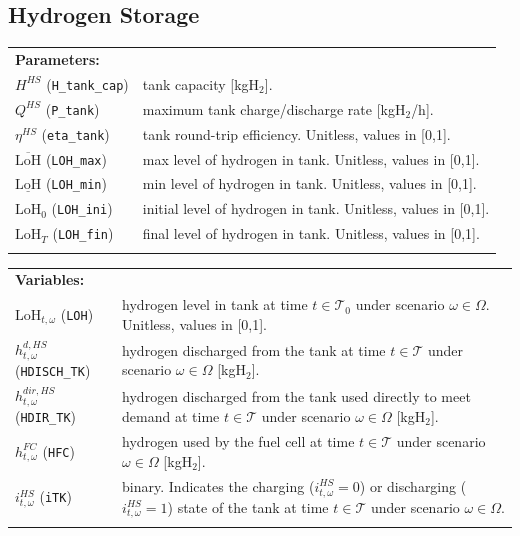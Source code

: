 \documentclass{article}
\newcommand{\LOH}{\text{LoH}}
\begin{document}
\subsection{Hydrogen Storage}
\label{SEC:StorageTank}

\noindent
\begin{tabularx}{\textwidth}{@{}l X@{}}
    \textbf{Parameters:} \\
    $H^{HS}$ (\verb|H_tank_cap|)
      & tank capacity [kgH$_2$]. \\
    $Q^{HS}$ (\verb|P_tank|)
      & maximum tank charge/discharge rate [kgH$_2$/h]. \\
    $\eta^{HS}$ (\verb|eta_tank|)
      & tank round-trip efficiency. Unitless, values in [0,1]. \\
    $\overline{\LOH}$ (\verb|LOH_max|)
      & max level of hydrogen in tank. Unitless, values in [0,1]. \\
    $\underline{\LOH}$ (\verb|LOH_min|)
      & min level of hydrogen in tank. Unitless, values in [0,1]. \\
    $\LOH_0$ (\verb|LOH_ini|)
      & initial level of hydrogen in tank. Unitless, values in [0,1]. \\
    $\LOH_T$ (\verb|LOH_fin|)
      & final level of hydrogen in tank. Unitless, values in [0,1]. \\
     \\
\end{tabularx}

\begin{tabularx}{\textwidth}{@{}l X@{}}
    \textbf{Variables:} \\
    $\LOH_{t,\omega}$ (\verb|LOH|)
      & hydrogen level in tank at time $t \in \mathcal{T}_0$ under scenario
        $\omega \in \Omega$. Unitless, values in [0,1]. \\
    $h^{d,HS}_{t,\omega}$ (\verb|HDISCH_TK|)
      & hydrogen discharged from the tank at time $t \in \mathcal{T}$
        under scenario $\omega \in \Omega$ [kgH$_2$]. \\
    $h^{dir,HS}_{t,\omega}$ (\verb|HDIR_TK|)
      & hydrogen discharged from the tank used directly to meet demand
        at time $t \in \mathcal{T}$ under scenario $\omega \in \Omega$ [kgH$_2$]. \\
    $h^{FC}_{t,\omega}$ (\verb|HFC|)
      & hydrogen used by the fuel cell at time $t \in \mathcal{T}$
        under scenario $\omega \in \Omega$ [kgH$_2$]. \\
    $i^{HS}_{t,\omega}$ (\verb|iTK|)
      & binary. Indicates the charging ($i^{HS}_{t,\omega} = 0$) or
        discharging ($i^{HS}_{t,\omega} = 1$) state of the tank at time
        $t \in \mathcal{T}$ under scenario $\omega \in \Omega$. \\
    \\
\end{tabularx}
\end{document}
